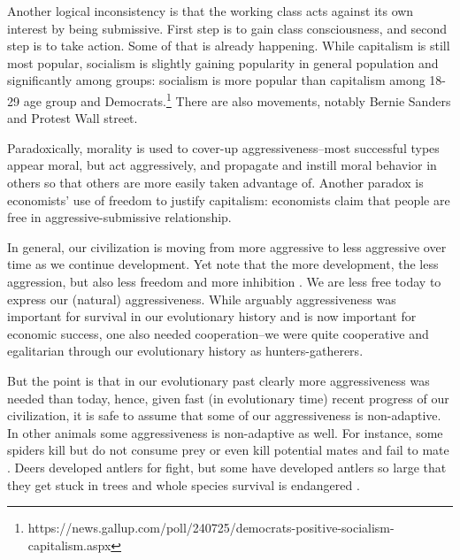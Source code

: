 \documentclass[11pt, letterpaper]{article}
\begin{document}
\begin{spacing}{2.0}
Another logical inconsistency is that the working class acts against its own interest by being submissive. First step is to gain class consciousness, and second step is to take action. Some of that is already happening.
 While capitalism is still most popular, socialism is slightly gaining
 popularity in general population and significantly among groups: socialism is
 more popular than capitalism among 18-29 age group and Democrats.\footnote{https://news.gallup.com/poll/240725/democrats-positive-socialism-capitalism.aspx}
 There are also movements, notably Bernie Sanders and Protest Wall street.

Paradoxically, morality is used to cover-up
aggressiveness--most successful types appear moral, but act aggressively, and
propagate and instill moral behavior in others so that others are more easily
taken advantage of. 
 Another paradox is economists' use of freedom to justify
capitalism: economists claim that people are free in aggressive-submissive relationship. %


In general, our civilization is moving from more aggressive to less aggressive over time as
we continue development. Yet note that the more development, the less aggression,
but also less freedom and more inhibition \citep{freud30}. We are less free
today to express our (natural) aggressiveness.  
%
%
While arguably aggressiveness was important for survival in our evolutionary
history and is now important for economic success, one also needed
cooperation--we were quite cooperative and egalitarian through our evolutionary
history as hunters-gatherers\citep{bowles11,maryanski92}. %

But the point is that in our evolutionary  past clearly more aggressiveness was
needed than today, hence, given fast (in evolutionary time) recent progress of
our civilization, it is safe to assume that some of our aggressiveness is
non-adaptive. In other animals some aggressiveness is non-adaptive as well. For instance,
some spiders kill but do not consume prey or even kill potential mates and fail to mate \citep{sih04}.
  Deers developed antlers for fight, but some have developed antlers so large
  that they get stuck in trees and whole species survival is endangered \cite{frank12}.  


\end{spacing}
\end{document}
